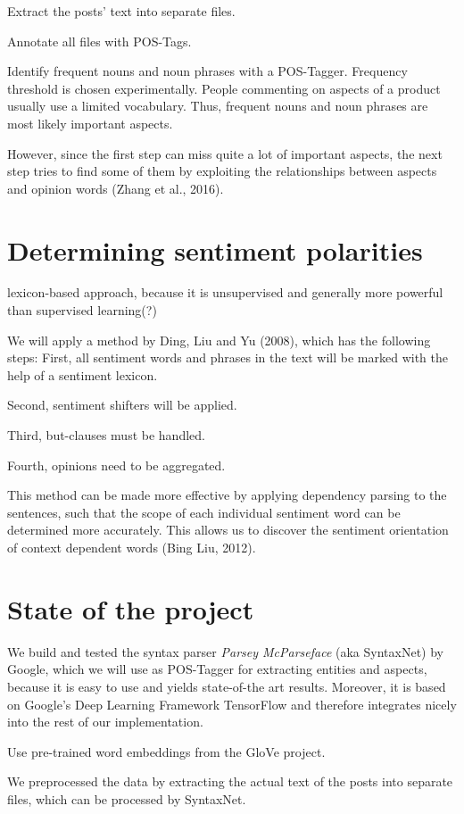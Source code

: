 \documentclass[10pt,a4paper]{article}
\begin{document}
	Extract the posts' text into separate files.
	
	Annotate all files with POS-Tags.
	
	Identify frequent nouns and noun phrases with a POS-Tagger. Frequency threshold is chosen experimentally. People commenting on aspects of a product usually use a limited vocabulary. Thus, frequent nouns and noun phrases are most likely important aspects.
	
	However, since the first step can miss quite a lot of important aspects, the next step tries to find some of them by exploiting the relationships between aspects and opinion words (Zhang et al., 2016).
	
	\section{Determining sentiment polarities}
	lexicon-based approach, because it is unsupervised and generally more powerful than supervised learning(?)
	
	We will apply a method by Ding, Liu and Yu (2008), which has the following steps: First, all sentiment words and phrases in the text will be marked with the help of a sentiment lexicon.
	
	Second, sentiment shifters will be applied.
	
	Third, but-clauses must be handled.
	
	Fourth, opinions need to be aggregated.

	This method can be made more effective by applying dependency parsing to the sentences, such that the scope of each individual sentiment word can be determined more accurately. This allows us to discover the sentiment orientation of context dependent words (Bing Liu, 2012).

	\section{State of the project}
	We build and tested the syntax parser \textit{Parsey McParseface} (aka SyntaxNet) by Google, which we will use as POS-Tagger for extracting entities and aspects, because it is easy to use and yields state-of-the art results. Moreover, it is based on Google's Deep Learning Framework TensorFlow and therefore integrates nicely into the rest of our implementation.
	
	Use pre-trained word embeddings from the GloVe project.
	
	We preprocessed the data by extracting the actual text of the posts into separate files, which can be processed by SyntaxNet.
	
\end{document}
